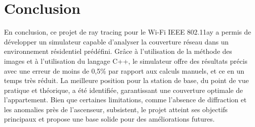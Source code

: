 \clearpage{}%
\chapter*{Conclusion}
\label{conclusion}

En conclusion, ce projet de ray tracing pour le Wi-Fi IEEE 802.11ay a permis de développer un simulateur capable d'analyser la couverture réseau dans un environnement résidentiel prédéfini. Grâce à l'utilisation de la méthode des images et à l'utilisation du langage C++, le simulateur offre des résultats précis avec une erreur de moins de 0,5\% par rapport aux calculs manuels, et ce en un temps très réduit. La meilleure position pour la station de base, du point de vue pratique et théorique, a été identifiée, garantissant une couverture optimale de l'appartement. Bien que certaines limitations, comme l'absence de diffraction et les anomalies près de l'ascenseur, subsistent, le projet atteint ses objectifs principaux et propose une base solide pour des améliorations futures.
